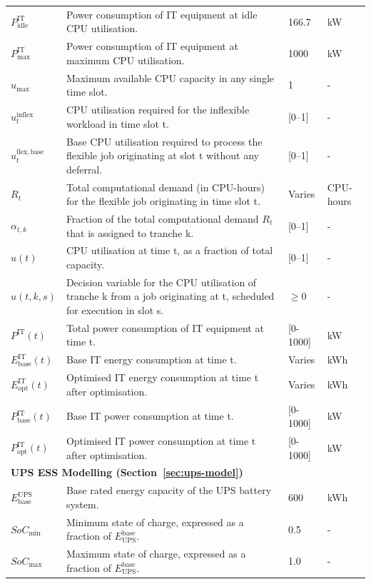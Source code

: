 \documentclass[lettersize,journal]{IEEEtran}
\begin{document}
{{\begin{longtable}{p{} p{} p{} p{}}
$P^{\mathrm{IT}}_{\mathrm{idle}}$ & Power consumption of IT equipment at idle CPU utilisation. & 166.7 &kW \\
$P^{\mathrm{IT}}_{\mathrm{max}}$ & Power consumption of IT equipment at maximum CPU utilisation. & 1000 &kW \\
$u_{\max}$ & Maximum available CPU capacity in any single time slot. & 1 & - \\
$u_t^{\mathrm{inflex}}$ & CPU utilisation required for the inflexible workload in time slot t. & [0–1] & - \\
$u_t^{\mathrm{flex,base}}$ & Base CPU utilisation required to process the flexible job originating at slot t without any deferral. & [0–1] & - \\
$R_t$ & Total computational demand (in CPU-hours) for the flexible job originating in time slot t. & Varies & CPU-hours \\
$\alpha_{t,k}$ & Fraction of the total computational demand $R_t$ that is assigned to tranche k. & [0–1] & - \\
$u(t)$ & CPU utilisation at time t, as a fraction of total capacity. & [0–1] & - \\
$u(t,k,s)$ & Decision variable for the CPU utilisation of tranche k from a job originating at t, scheduled for execution in slot s. & $\geq 0$ & - \\
$P^{\mathrm{IT}}(t)$ & Total power consumption of IT equipment at time t. & [0-1000] &kW \\
$E^{\mathrm{IT}}_{\mathrm{base}}(t)$ & Base IT energy consumption at time t. & Varies &kWh \\
$E^{\mathrm{IT}}_{\mathrm{opt}}(t)$ & Optimised IT energy consumption at time t after optimisation. & Varies &kWh \\
$P^{\mathrm{IT}}_{\mathrm{base}}(t)$ & Base IT power consumption at time t. & [0-1000] &kW \\
$P^{\mathrm{IT}}_{\mathrm{opt}}(t)$ & Optimised IT power consumption at time t after optimisation. & [0-1000] &kW \\
\midrule
\multicolumn{4}{l}{\textbf{UPS ESS Modelling (Section~\ref{sec:ups-model})}} \\
\midrule
$E^{\mathrm{UPS}}_{\mathrm{base}}$ & Base rated energy capacity of the UPS battery system. & 600 &kWh \\
$SoC_{\min}$ & Minimum state of charge, expressed as a fraction of $E_{\mathrm{UPS}}^{\mathrm{base}}$. & 0.5 & - \\
$SoC_{\max}$ & Maximum state of charge, expressed as a fraction of $E_{\mathrm{UPS}}^{\mathrm{base}}$. & 1.0 & - \\

\end{longtable}}}
\end{document}
